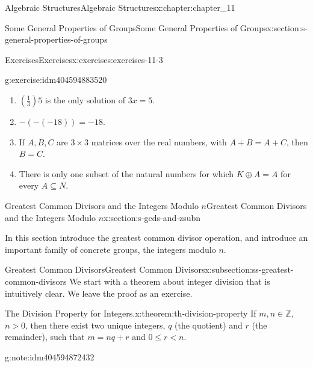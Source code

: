 \documentclass[twoside,10pt,]{book}
\numberwithin{equation}{section}
\begin{document}
\begin{chapterptx}{Algebraic Structures}{}{Algebraic Structures}{}{}{x:chapter:chapter_11}
\begin{sectionptx}{Some General Properties of Groups}{}{Some General Properties of Groups}{}{}{x:section:s-general-properties-of-groups}
\begin{exercises-subsection}{Exercises}{}{Exercises}{}{}{x:exercises:exercises-11-3}
\begin{divisionexercise}{6}{}{}{g:exercise:idm404594883520}
\begin{enumerate}[label=(\alph*)]
\item{}\(\left(\frac{1}{3}\right)5\) is the only solution of \(3x = 5\).%
\item{}\(-(-(-18)) = -18\).%
\item{}If \(A, B, C\) are \(3\times 3\) matrices over the real numbers, with \(A + B = A + C\), then \(B = C\).%
\item{}There is only one subset of the natural numbers for which \(K \oplus  A = A\) for every \(A \subseteq N\).%
\end{enumerate}
%
\end{divisionexercise}%
\end{exercises-subsection}
\end{sectionptx}
%
%
\typeout{************************************************}
\typeout{************************************************}
%
\begin{sectionptx}{Greatest Common Divisors  and the Integers Modulo \(n\)}{}{Greatest Common Divisors  and the Integers Modulo \(n\)}{}{}{x:section:s-gcds-and-zsubn}
\begin{introduction}{}%
In this section introduce the greatest common divisor operation, and  introduce an important family of concrete groups, the integers modulo \(n\).%
\end{introduction}%
%
%
\typeout{************************************************}
\typeout{************************************************}
%
\begin{subsectionptx}{Greatest Common Divisors}{}{Greatest Common Divisors}{}{}{x:subsection:ss-greatest-common-divisors}
We start with a theorem about integer division that is intuitively clear.  We leave the proof as an  exercise.%
\begin{theorem}{The Division Property for Integers.}{}{x:theorem:th-division-property}%
%
If \(m, n\in \mathbb{Z}\), \(n>0\), then there exist two unique integers, \(q\) (the quotient) and \(r\) (the remainder), such that \(m = n q + r\) and \(0 \leq  r < n\).%
\end{theorem}
\begin{note}{}{g:note:idm404594872432}%

\end{note}
\end{subsectionptx}
\end{sectionptx}
\end{chapterptx}
\end{document}

